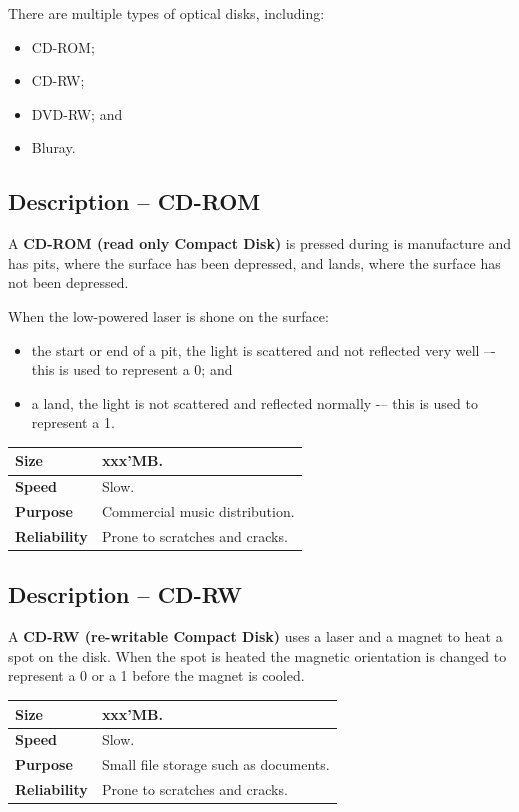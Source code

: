 \documentclass[a4paper]{systems-software}
\begin{document}
There are multiple types of optical disks, including:
\begin{itemize}
	\item CD-ROM;
	\item CD-RW;
	\item DVD-RW; and
	\item Bluray.
\end{itemize}

\subsection*{Description -- CD-ROM}

A \textbf{CD-ROM (read only Compact Disk)} is pressed during is manufacture and has pits, where the surface has been depressed, and lands, where the surface has not been depressed.

When the low-powered laser is shone on the surface:
\begin{itemize}
	\item the start or end of a pit, the light is scattered and not reflected very well –- this is used to represent a 0; and
	\item a land, the light is not scattered and reflected normally -– this is used to represent a 1.
\end{itemize}

\begin{longtabu} to \textwidth {| X[1,l] | X[6,l] |}
    \hline
    \textbf{Size} & xxx'MB.
	\\ \hline
	\textbf{Speed} & Slow.
	\\ \hline
	\textbf{Purpose} & Commercial music distribution.
	\\ \hline
	\textbf{Reliability} & Prone to scratches and cracks.
	\\ \hline
\end{longtabu}


\subsection*{Description -- CD-RW}

A \textbf{CD-RW (re-writable Compact Disk)} uses a laser and a magnet to heat a spot on the disk. When the spot is heated the magnetic orientation is changed to represent a 0 or a 1 before the magnet is cooled.

\begin{longtabu} to \textwidth {| X[1,l] | X[6,l] |}
    \hline
    \textbf{Size} & xxx'MB.
	\\ \hline
	\textbf{Speed} & Slow.
	\\ \hline
	\textbf{Purpose} & Small file storage such as documents.
	\\ \hline
	\textbf{Reliability} & Prone to scratches and cracks.
	\\ \hline
\end{longtabu}
\end{document}
